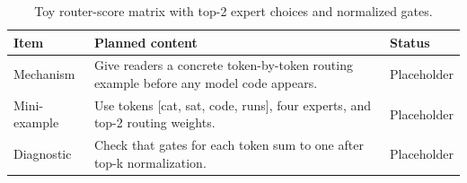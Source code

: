 \begin{table}[H]
\centering
\caption{Toy router-score matrix with top-2 expert choices and normalized gates.}
\label{tab:ch01-a-tiny-routing-story}
\begin{tabularx}{\textwidth}{p{}X p{}}
\toprule
Item & Planned content & Status \\
\midrule
Mechanism & Give readers a concrete token-by-token routing example before any model code appears. & Placeholder \\
Mini-example & Use tokens [cat, sat, code, runs], four experts, and top-2 routing weights. & Placeholder \\
Diagnostic & Check that gates for each token sum to one after top-k normalization. & Placeholder \\
\bottomrule
\end{tabularx}
\end{table}
